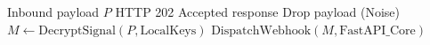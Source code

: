\begin{algorithm}[htbp]
\caption{Edge Message Filtration (WhatsApp WSS)}
\label{alg:message_filtration}
\begin{algorithmic}[1]
\REQUIRE Inbound payload $P$
\ENSURE HTTP 202 Accepted response
    \STATE Drop payload (Noise)
    \RETURN
\ENDIF
{}
    \STATE $M \leftarrow \text{DecryptSignal}(P, \text{LocalKeys})$
\ENDIF
\STATE $\text{DispatchWebhook}(M, \text{FastAPI\_Core})$
\RETURN {}
\end{algorithmic}
\end{algorithm}
